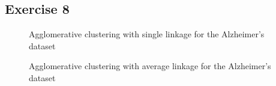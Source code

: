 \documentclass[11pt, a4paper]{article}
\begin{document}
\subsection{Exercise 8}

\begin{figure}[H]
\caption{Agglomerative clustering with single linkage for the Alzheimer's dataset}\label{figR8a}
\end{figure}

\begin{figure}[H]
\caption{Agglomerative clustering with average linkage for the Alzheimer's dataset}\label{figR8b}
\end{figure}
\end{document}
